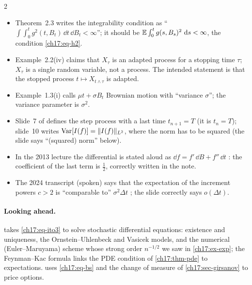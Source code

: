 \begin{paracol}{2}
\begin{coursenote}
\begin{itemize}
  \item {} Theorem~2.3 writes the integrability condition as ``$\int\!\!\int_0^tg^2(t,B_t)\,\dd t\,\dd B_t<\infty$''; it should be $\mathbb{E}\int_0^tg(s,B_s)^2\,\,\mathrm{d} s<\infty$, the condition \eqref{ch17:eq-h2}.
  \item {} Example~2.2(iv) claims that $X_\tau$ is an adapted process for a stopping time $\tau$; $X_\tau$ is a single random variable, not a process. The intended statement is that the stopped process $t\mapsto X_{t\wedge\tau}$ is adapted.
  \item {} Example~1.3(i) calls $\mu t+\sigma B_t$ Brownian motion with ``variance $\sigma$''; the variance parameter is $\sigma^2$.
  \item Slide~7 of  defines the step process with a last time $t_{n+1}=T$ (it is $t_n=T$); slide~10 writes $\operatorname{Var}[I(f)]=\|I(f)\|_{L^2}$, where the norm has to be squared (the slide says ``(squared) norm'' below).
  \item In the 2013 lecture the differential is stated aloud as $\dd f=f'\,\dd B+f''\,\dd t$ : the coefficient of the last term is $\tfrac12$, correctly written in the note.
  \item The 2024 transcript (spoken) says that the expectation of the increment powers $c>2$ is ``comparable to'' $\sigma^2\Delta t$ ; the slide correctly says $o(\Delta t)$.
\end{itemize}
\end{coursenote}

\paragraph{Looking ahead.}  takes \eqref{ch17:eq-ito3} to solve stochastic differential equations: existence and uniqueness, the Ornstein--Uhlenbeck and Vasicek models, and the numerical (Euler--Maruyama) scheme whose strong order $n^{-1/2}$ we saw in \cref{ch17:ex-exp}; the Feynman--Kac formula
links the PDE condition of \cref{ch17:thm-pde} to expectations.  uses \eqref{ch17:eq-bs} and the change of measure of \cref{ch17:sec-girsanov} to price options.


\end{paracol}

